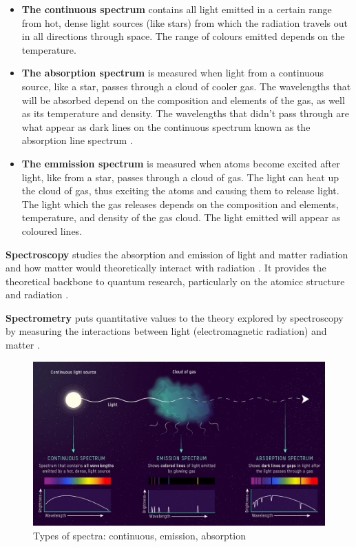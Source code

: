 \documentclass[12pt]{article}
\begin{document}
\begin{itemize}
    \item \textbf{The continuous spectrum} contains all light emitted in a certain range from hot, dense light sources (like stars)
    from which the radiation travels out in all directions through space. The range of colours emitted depends on the temperature.
    \item \textbf{The absorption spectrum} is measured when light from a continuous source, like a star, passes through a cloud of cooler gas.
    The wavelengths that will be absorbed depend on the composition and elements of the gas, as well as its temperature and density. The wavelengths
    that didn't pass through are what appear as dark lines on the continuous spectrum known as the absorption line spectrum \cite{cosmosabsorp}.
    \item \textbf{The emmission spectrum} is measured when atoms become excited after light, like from a star, passes through a cloud of gas.
    The light can heat up the cloud of gas, thus exciting the atoms and causing them to release light. The light which the gas releases depends on the
    composition and elements, temperature, and density of the gas cloud. The light emitted will appear as coloured lines.
\end{itemize}

\textbf{Spectroscopy} studies the absorption and emission of light and matter radiation \cite{britspectrosco} and how matter would theoretically interact with radiation \cite{ataspectrosco}.
It provides the theoretical backbone to quantum research, particularly on the atomicc structure and radiation
\cite{ataspectrosco}.

\textbf{Spectrometry} puts quantitative values to the theory explored by spectroscopy by measuring the interactions between light (electromagnetic radiation)
and matter
\cite{ataspectrosco}.

\begin{figure}[H]
    \centering
    \includegraphics[width=15cm]{spectra.jpg}
    \caption{\centering \footnotesize{Types of spectra: continuous, emission, absorption \protect\cite{spectrapic}}}
    \label{fig:spectra}
\end{figure}
\end{document}
